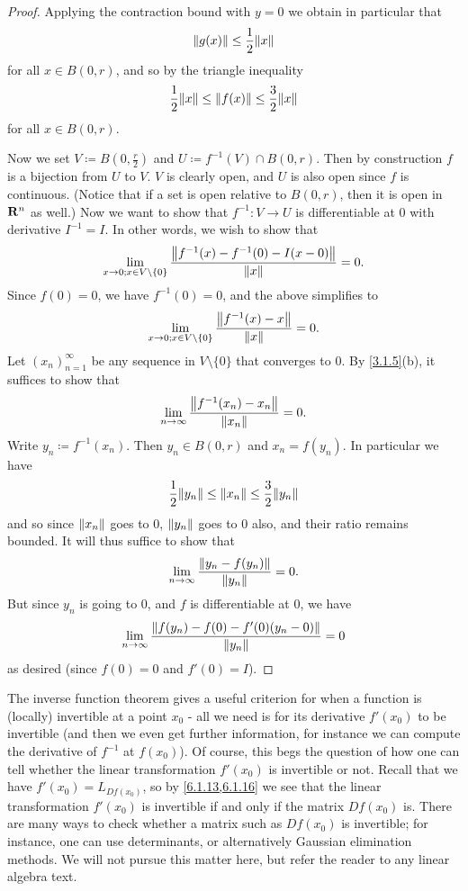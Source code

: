 \begin{proof}
  Applying the contraction bound with \(y = 0\) we obtain in particular that
  \[
    \norm*{g(x)} \leq \frac{1}{2} \norm*{x}
  \]
  for all \(x \in B(0, r)\), and so by the triangle inequality
  \[
    \frac{1}{2} \norm*{x} \leq \norm*{f(x)} \leq \frac{3}{2} \norm*{x}
  \]
  for all \(x \in B(0, r)\).

  Now we set \(V \coloneqq B(0, \frac{r}{2})\) and \(U \coloneqq f^{-1}(V) \cap B(0, r)\).
  Then by construction \(f\) is a bijection from \(U\) to \(V\).
  \(V\) is clearly open, and \(U\) is also open since \(f\) is continuous.
  (Notice that if a set is open relative to \(B(0, r)\), then it is open in \(\R^n\) as well.)
  Now we want to show that \(f^{-1} : V \to U\) is differentiable at \(0\) with derivative \(I^{-1} = I\).
  In other words, we wish to show that
  \[
    \lim_{x \to 0 ; x \in V \setminus \{0\}} \frac{\norm*{f^{-1}(x) - f^{-1}(0) - I(x - 0)}}{\norm*{x}} = 0.
  \]
  Since \(f(0) = 0\), we have \(f^{-1}(0) = 0\), and the above simplifies to
  \[
    \lim_{x \to 0 ; x \in V \setminus \{0\}} \frac{\norm*{f^{-1}(x) - x}}{\norm*{x}} = 0.
  \]
  Let \((x_n)_{n = 1}^\infty\) be any sequence in \(V \setminus \{0\}\) that converges to \(0\).
  By \cref{3.1.5}(b), it suffices to show that
  \[
    \lim_{n \to \infty} \frac{\norm*{f^{-1}(x_n) - x_n}}{\norm*{x_n}} = 0.
  \]
  Write \(y_n \coloneqq f^{-1}(x_n)\).
  Then \(y_n \in B(0, r)\) and \(x_n = f(y_n)\).
  In particular we have
  \[
    \frac{1}{2} \norm*{y_n} \leq \norm*{x_n} \leq \frac{3}{2} \norm*{y_n}
  \]
  and so since \(\norm*{x_n}\) goes to \(0\), \(\norm*{y_n}\) goes to \(0\) also, and their ratio remains bounded.
  It will thus suffice to show that
  \[
    \lim_{n \to \infty} \frac{\norm*{y_n - f(y_n)}}{\norm*{y_n}} = 0.
  \]
  But since \(y_n\) is going to \(0\), and \(f\) is differentiable at \(0\), we have
  \[
    \lim_{n \to \infty} \frac{\norm*{f(y_n) - f(0) - f'(0)(y_n - 0)}}{\norm*{y_n}} = 0
  \]
  as desired (since \(f(0) = 0\) and \(f'(0) = I\)).
\end{proof}

\begin{note}
  The inverse function theorem gives a useful criterion for when a function is (locally) invertible at a point \(x_0\)
  - all we need is for its derivative \(f'(x_0)\) to be invertible
  (and then we even get further information, for instance we can compute the derivative of \(f^{-1}\) at \(f(x_0)\)).
  Of course, this begs the question of how one can tell whether the linear transformation \(f'(x_0)\) is invertible or not.
  Recall that we have \(f'(x_0) = L_{D f(x_0)}\), so by \cref{6.1.13,6.1.16} we see that the linear transformation \(f'(x_0)\) is invertible if and only if the matrix \(D f(x_0)\) is.
  There are many ways to check whether a matrix such as \(D f(x_0)\) is invertible;
  for instance, one can use determinants, or alternatively Gaussian elimination methods.
  We will not pursue this matter here, but refer the reader to any linear algebra text.
\end{note}


